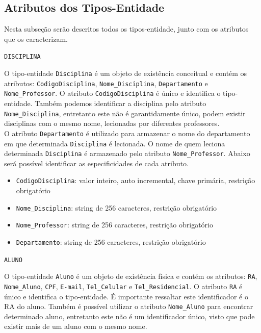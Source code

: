 \documentclass[12pt,a4paper]{article}
\begin{document}
\subsection{Atributos dos Tipos-Entidade} \label{atributos_entidades}

Nesta subseção serão descritos todos os tipos-entidade, junto com os atributos que os caracterizam.

\vspace{0.5cm}
\begin{center}
    \texttt{DISCIPLINA}
\end{center}

\hspace{6}O tipo-entidade {\texttt{Disciplina}} é um objeto de existência conceitual e contém os atributos: {\texttt{CodigoDisciplina}}, {\texttt{Nome\_Disciplina}}, {\texttt{Departamento}} e {\texttt{Nome\_Professor}}. O atributo {\texttt{CodigoDisciplina}} é único e identifica o tipo-entidade. Também podemos identificar a disciplina pelo atributo {\texttt{Nome\_Disciplina}}, entretanto este não é garantidamente único, podem existir disciplinas com o mesmo nome, lecionadas por diferentes professores.\\

O atributo {\texttt{Departamento}} é utilizado para armazenar o nome do departamento em que determinada \texttt{Disciplina} é lecionada. O nome de quem leciona determinada \texttt{Disciplina} é armazenado pelo atributo {\texttt{Nome\_Professor}}. Abaixo será possível identificar as especificidades de cada atributo. \\

\begin{itemize}
    \item {\texttt{CodigoDisciplina}}: valor inteiro, auto incremental, chave primária, restrição obrigatório
    \item {\texttt{Nome\_Disciplina}}: string de 256 caracteres, restrição obrigatório
    \item {\texttt{Nome\_Professor}}: string de 256 caracteres, restrição obrigatório
    \item {\texttt{Departamento}}: string de 256 caracteres, restrição obrigatório
\end{itemize}

\vspace{0.5cm}
\begin{center}
    \texttt{ALUNO}
\end{center}

O tipo-entidade {\texttt{Aluno}} é um objeto de existência física e contém os atributos: {\texttt{RA}}, {\texttt{Nome\_Aluno}}, {\texttt{CPF}}, {\texttt{E-mail}}, {\texttt{Tel\_Celular} e \texttt{Tel\_Residencial}}. O atributo {\texttt{RA}} é único e identifica o tipo-entidade. É importante ressaltar este identificador é o RA do aluno. Também é possível utilizar o atributo {\texttt{Nome\_Aluno}} para encontrar determinado aluno, entretanto este não é um identificador único, visto que pode existir mais de um aluno com o mesmo nome.\\
\end{document}
